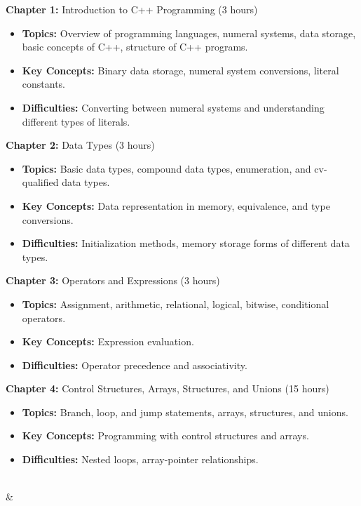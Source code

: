 \textbf{Chapter 1:} Introduction to C++ Programming (3 hours) 
\begin{itemize}[topsep=0pt, partopsep=0pt, parsep=0pt, itemsep=1pt]
    \item \textbf{Topics:} Overview of programming languages, numeral systems, data storage, basic concepts of C++, structure of C++ programs. 
    \item \textbf{Key Concepts:} Binary data storage, numeral system conversions, literal constants. 
    \item \textbf{Difficulties:} Converting between numeral systems and understanding different types of literals.
\end{itemize}

\textbf{Chapter 2:} Data Types (3 hours) 
\begin{itemize}[topsep=0pt, partopsep=0pt, parsep=0pt, itemsep=1pt]
    \item \textbf{Topics:} Basic data types, compound data types, enumeration, and cv-qualified data types. 
    \item \textbf{Key Concepts:} Data representation in memory, equivalence, and type conversions. 
    \item \textbf{Difficulties:} Initialization methods, memory storage forms of different data types.
\end{itemize}

\textbf{Chapter 3:} Operators and Expressions (3 hours) 
\begin{itemize}[topsep=0pt, partopsep=0pt, parsep=0pt, itemsep=1pt]
    \item \textbf{Topics:} Assignment, arithmetic, relational, logical, bitwise, conditional operators. 
    \item \textbf{Key Concepts:} Expression evaluation. 
    \item \textbf{Difficulties:} Operator precedence and associativity.
\end{itemize}

\textbf{Chapter 4:} Control Structures, Arrays, Structures, and Unions (15 hours) 
\begin{itemize}[topsep=0pt, partopsep=0pt, parsep=0pt, itemsep=1pt]
    \item \textbf{Topics:} Branch, loop, and jump statements, arrays, structures, and unions. 
    \item \textbf{Key Concepts:} Programming with control structures and arrays. 
    \item \textbf{Difficulties:} Nested loops, array-pointer relationships.
\end{itemize}
\\
\hline%
\textbf{} & 

